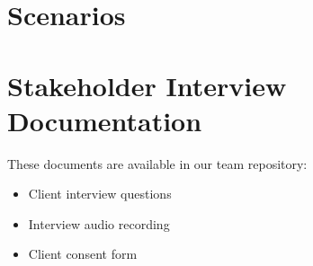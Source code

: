 \documentclass{l3deliverable}
\begin{document}
\section{Scenarios}


\section{Stakeholder Interview Documentation}
These documents are available in our team repository:
\begin{itemize}
	\item{Client interview questions}
	\item{Interview audio recording}
	\item{Client consent form}
\end{itemize}




\end{document}
